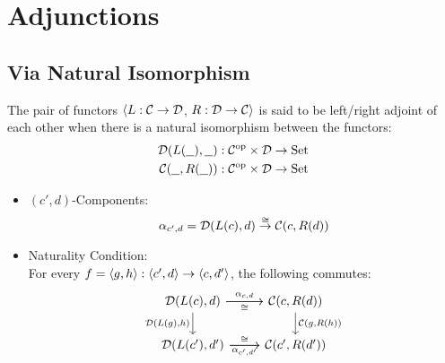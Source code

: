 \section{Adjunctions}

\subsection{Via Natural Isomorphism}

\begin{definition}
  The pair of functors $\langle L: \mathcal{C}\to \mathcal{D}$, $R: \mathcal{D}\to \mathcal{C}\rangle$ is said to be left/right
  adjoint of each other when there is a natural isomorphism between the
  functors:
  \parencite{leinster:basic_category_theory}
  \[
    \begin{aligned}
      \mathcal{D}(L(\underline{\ \ }), \underline{\ \ })
        &: \mathcal{C}^{\mathrm{op}} \times \mathcal{D} \to \mathrm{Set}\\
      \mathcal{C}(\underline{\ \ }, R(\underline{\ \ }))
        &: \mathcal{C}^{\mathrm{op}} \times \mathcal{D} \to \mathrm{Set}\\
    \end{aligned}
  \]

  \begin{itemize}
    \item $(c', d)$-Components:
      \[
        \alpha_{c', d}
          = \mathcal{D}(L(c), d) \overset{\cong}{\to} \mathcal{C}(c, R(d))\\
      \]
    \item Naturality Condition:\\
      For every $f = \langle g, h\rangle: \langle c', d\rangle \to \langle c, d'\rangle$, the following commutes:
      \[\begin{tikzcd}[ampersand replacement=\&]
        {\D(L(c), d)} \& {\C(c, R(d))} \\
        {\D(L(c'),d')} \& {\C(c',R(d'))}
        \arrow["{\D(L(g), h)}"', from=1-1, to=2-1]
        \arrow["{\C(g, R(h))}", from=1-2, to=2-2]
        \arrow["{\alpha_{c, d}}", from=1-1, to=1-2]
        \arrow["{\alpha_{c',d'}}"', from=2-1, to=2-2]
        \arrow["\cong"', from=1-1, to=1-2]
        \arrow["\cong", from=2-1, to=2-2]
      \end{tikzcd}\]
  \end{itemize}
\end{definition}

